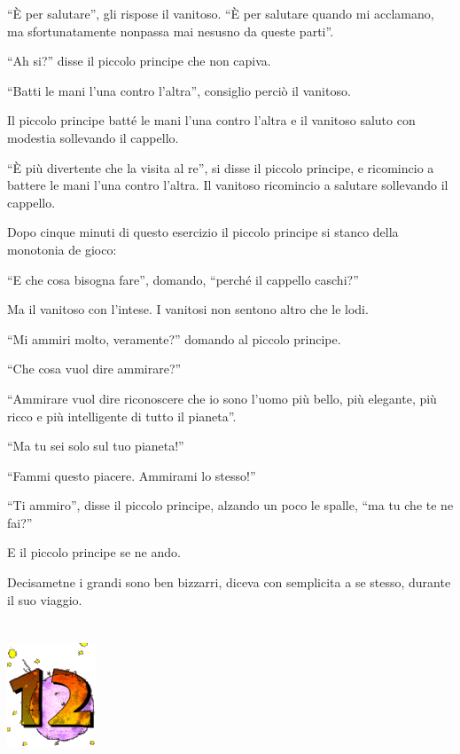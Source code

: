 \documentclass[11pt]{scrbook}
\begin{document}
``È per salutare'', gli rispose il vanitoso. ``È per salutare quando mi
acclamano, ma sfortunatamente nonpassa mai nesusno da queste parti''.

``Ah si?'' disse il piccolo principe che non capiva.

``Batti le mani l'una contro l'altra'', consiglio perciò il vanitoso.

Il piccolo principe batté le mani l'una contro l'altra e il vanitoso
saluto con modestia sollevando il cappello.

``È più divertente che la visita al re'', si disse il piccolo principe,
e ricomincio a battere le mani l'una contro l'altra. Il vanitoso
ricomincio a salutare sollevando il cappello.

Dopo cinque minuti di questo esercizio il piccolo principe si stanco
della monotonia de gioco:

``E che cosa bisogna fare'', domando, ``perché il cappello caschi?''

Ma il vanitoso con l'intese. I vanitosi non sentono altro che le lodi.

``Mi ammiri molto, veramente?'' domando al piccolo principe.

``Che cosa vuol dire ammirare?''

``Ammirare vuol dire riconoscere che io sono l'uomo più bello, più
elegante, più ricco e più intelligente di tutto il pianeta''.

``Ma tu sei solo sul tuo pianeta!''

``Fammi questo piacere. Ammirami lo stesso!''

``Ti ammiro'', disse il piccolo principe, alzando un poco le spalle,
``ma tu che te ne fai?''

E il piccolo principe se ne ando.

Decisametne i grandi sono ben bizzarri, diceva con semplicita a se
stesso, durante il suo viaggio.

\chapter{}
\begin{center}
\includegraphics{./img/chapter12.png}
\end{center}
\end{document}
